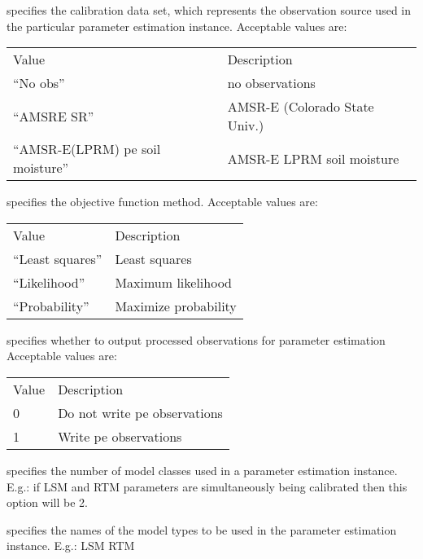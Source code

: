   specifies
 the calibration data set,
 which represents the observation source used in the particular
 parameter estimation instance.
 Acceptable values are:

 \begin{tabular}{ll}
 Value                    & Description                               \\
 ``No obs''               & no observations                           \\
 ``AMSRE SR''             & AMSR-E (Colorado State Univ.)             \\
 ``AMSR-E(LPRM) pe soil moisture'' & AMSR-E LPRM soil moisture        \\
 \end{tabular}

  specifies the objective function
 method.
 Acceptable values are:

 \begin{tabular}{ll}
 Value             & Description                         \\
 ``Least squares'' & Least squares                       \\
 ``Likelihood''    & Maximum likelihood                  \\
 ``Probability''   & Maximize probability                \\
 \end{tabular}

  specifies whether to output processed
 observations for parameter estimation
 Acceptable values are:

 \begin{tabular}{ll}
 Value & Description                  \\
 0     & Do not write pe observations \\
 1     & Write pe observations        \\
 \end{tabular}

 specifies the number of model classes used in a parameter estimation
 instance.  E.g.: if LSM and RTM parameters are simultaneously being
 calibrated then this option will be 2.

  specifies the
 names of the model types to be used in the parameter estimation
 instance.  E.g.: LSM RTM

